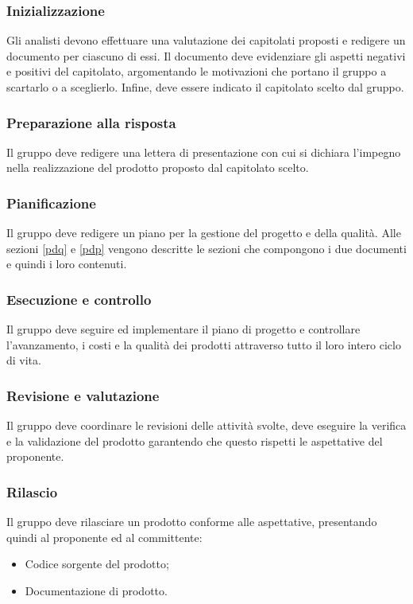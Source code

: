 \subsubsection{Inizializzazione} 
Gli analisti devono effettuare una valutazione dei capitolati proposti e redigere un documento per ciascuno di essi. Il documento deve evidenziare gli aspetti negativi e positivi del capitolato, argomentando le motivazioni che portano il gruppo a scartarlo o a sceglierlo. Infine, deve essere indicato il capitolato scelto dal gruppo.

\subsubsection{Preparazione alla risposta}
Il gruppo deve redigere una lettera di presentazione con cui si dichiara l'impegno nella realizzazione del prodotto proposto dal capitolato scelto.

\subsubsection{Pianificazione}
Il gruppo deve redigere un piano per la gestione del progetto e della qualità. Alle sezioni \ref{pdq} e \ref{pdp} vengono descritte le sezioni che compongono i due documenti e quindi i loro contenuti.

\subsubsection{Esecuzione e controllo}
Il gruppo deve seguire ed implementare il piano di progetto e controllare l'avanzamento, i costi e la qualità dei prodotti attraverso tutto il loro intero ciclo di vita.

\subsubsection{Revisione e valutazione}
Il gruppo deve coordinare le revisioni delle attività svolte, deve eseguire la verifica e la validazione del prodotto garantendo che questo rispetti le aspettative del proponente.

\subsubsection{Rilascio}
Il gruppo deve rilasciare un prodotto conforme alle aspettative, presentando quindi al proponente ed al committente:
\begin{itemize}
	\item Codice sorgente del prodotto;
	\item Documentazione di prodotto.
\end{itemize}

